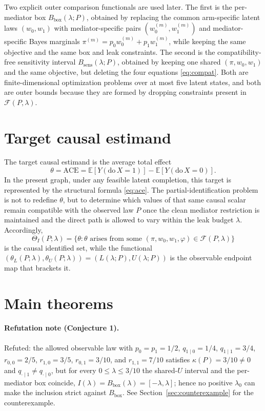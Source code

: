 \documentclass[11pt]{article}
\newcommand{\E}{\mathbb{E}}
\theoremstyle{definition}
\theoremstyle{plain}
\theoremstyle{remark}
\begin{document}
Two explicit outer comparison functionals are used later. The first is the
per-mediator box \(B_{\mathrm{box}}(\lambda;P)\), obtained by replacing the common
arm-specific latent laws \((w_0,w_1)\) with mediator-specific pairs
\((w_0^{(m)},w_1^{(m)})\) and mediator-specific Bayes marginals
\(\pi^{(m)}=p_0w_0^{(m)}+p_1w_1^{(m)}\), while keeping the same objective and the same
box and leak constraints. The second is the compatibility-free sensitivity interval
\(B_{\mathrm{sens}}(\lambda;P)\), obtained by keeping one shared
\((\pi,w_0,w_1)\) and the same objective, but deleting the four equations
\eqref{eq:compat}. Both are finite-dimensional optimization problems over at most five
latent states, and both are outer bounds because they are formed by dropping
constraints present in \(\mathcal F(P,\lambda)\).

\section{Target causal estimand}
The target causal estimand is the average total effect
\[
  \theta=\mathrm{ACE}=\E[Y(\mathrm{do}\,X=1)]-\E[Y(\mathrm{do}\,X=0)].
\]
In the present graph, under any feasible latent completion, this target is represented
by the structural formula \eqref{eq:ace}. The partial-identification problem is not to
redefine \(\theta\), but to determine which values of that same causal scalar remain
compatible with the observed law \(P\) once the clean mediator restriction is
maintained and the direct path is allowed to vary within the leak budget \(\lambda\).
Accordingly,
\[
  \Theta_I(P;\lambda)=\{\theta:\theta \text{ arises from some }
  (\pi,w_0,w_1,\varphi)\in\mathcal F(P,\lambda)\}
\]
is the causal identified set, while the functional
\((\theta_L(P;\lambda),\theta_U(P;\lambda))=(L(\lambda;P),U(\lambda;P))\) is the
observable endpoint map that brackets it.

\section{Main theorems}
\paragraph{Refutation note (Conjecture 1).}
Refuted: the allowed observable law with \(p_0=p_1=1/2\), \(q_{1\mid0}=1/4\), \(q_{1\mid1}=3/4\), \(r_{0,0}=2/5\), \(r_{1,0}=3/5\), \(r_{0,1}=3/10\), and \(r_{1,1}=7/10\) satisfies \(\kappa(P)=3/10\neq0\) and \(q_{\cdot\mid1}\neq q_{\cdot\mid0}\), but for every \(0\le\lambda\le3/10\) the shared-\(U\) interval and the per-mediator box coincide, \(I(\lambda)=B_{\mathrm{box}}(\lambda)=[-\lambda,\lambda]\); hence no positive \(\lambda_0\) can make the inclusion strict against \(B_{\mathrm{box}}\). See Section~\ref{sec:counterexample} for the counterexample.
\end{document}
